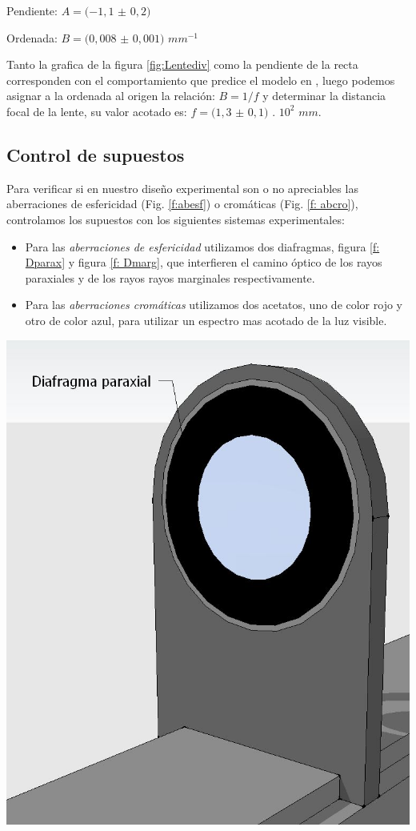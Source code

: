 \documentclass[a4paper,12pt]{article}
\newenvironment{Figure}
  {\par\medskip\noindent\minipage{\linewidth}}
  {\endminipage\par\medskip}
\begin{document}
\begin{multicols*}{2}
        Pendiente: $A=(-1,1$ $\pm$ $0,2)$

        Ordenada: $B=(0,008$ $\pm$ $0,001)$ $mm^{-1}$

        Tanto la grafica de la figura \ref{fig:Lentediv} como la pendiente de la recta corresponden con el comportamiento que predice el modelo en , luego podemos asignar a la ordenada al origen la relación: $B=1/f$ y determinar la distancia focal de la lente, su valor acotado es: $f=(1,3$ $\pm$ $0,1)$ . $10^{2}$ $mm$.
 
    \subsection*{Control de supuestos}

        Para verificar si en nuestro diseño experimental son o no apreciables las aberraciones de esfericidad (Fig. \ref{f:abesf}) o cromáticas (Fig. \ref{f: abcro}), controlamos los supuestos con los siguientes sistemas experimentales:

        \begin{itemize}
            \item Para las \emph{aberraciones de esfericidad} utilizamos dos diafragmas, figura \ref{f: Dparax} y figura \ref{f: Dmarg}, que interfieren el camino óptico de los rayos paraxiales y de los rayos rayos marginales respectivamente.
            \item Para las \emph{aberraciones cromáticas} utilizamos dos acetatos, uno de color rojo y otro de color azul, para utilizar un espectro mas acotado de la luz visible.
        \end{itemize}

        \begin{Figure}
            \centering
            \includegraphics[width=0.7\linewidth]{Diafragma paraxial.JPG}
            \label{f: Dparax}
        \end{Figure}


\end{multicols*}
\end{document}
